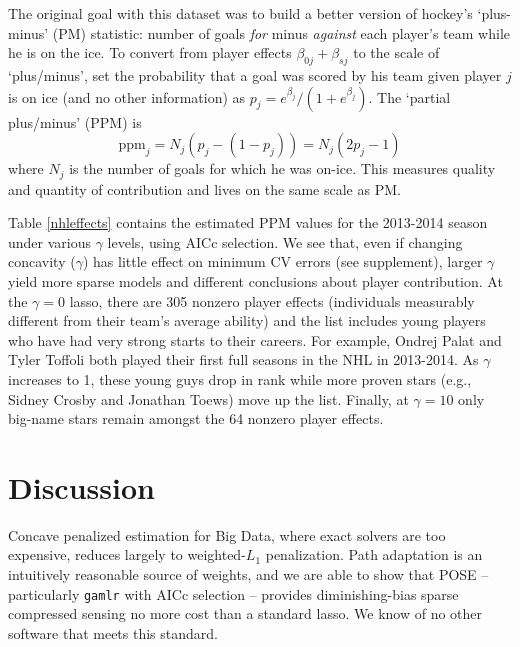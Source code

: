 \documentclass[twoside]{article}
\newcommand{\mr}[1]{\mathrm{#1}}
\begin{document}
The original goal with this dataset was to build a better version of
hockey's `plus-minus' (PM) statistic: number of goals {\it for} minus {\it
against} each player's team while he is on the ice. To convert from player
effects $\beta_{0j} + \beta_{sj}$ to the scale of `plus/minus', set the probability that a goal was scored by his team given player
$j$ is on ice  (and no other information) as $p_j = e^{\beta_j}/(1+e^{\beta_j})$. The `partial
plus/minus' (PPM) is \[ \mr{ppm}_j = N_j(p_j - (1-p_j)) = N_j(2p_j-1) \] where
$N_j$ is the  number of goals for which he was on-ice.  This measures 
quality and quantity of contribution and lives on the same scale as PM.

Table \ref{nhleffects} contains the estimated PPM values for the 2013-2014
season under various $\gamma$ levels, using AICc selection.  We see that, even
if changing concavity ($\gamma$) has little effect on minimum CV errors (see supplement),
larger $\gamma$  yield more sparse models and different conclusions about
player contribution. At the $\gamma=0$ lasso, there are 305 nonzero player
effects (individuals measurably different from their team's average ability)
and the list includes young players who have had very strong starts to their
careers.  For example, Ondrej Palat and Tyler Toffoli both played their first
full seasons in the NHL in 2013-2014.  As $\gamma$ increases to 1, these young
guys  drop in rank while more proven stars (e.g., Sidney Crosby and Jonathan
Toews) move up the list.  Finally, at $\gamma=10$ only big-name stars remain
amongst the 64 nonzero player effects.


\section{Discussion}
\label{discussion}


Concave penalized estimation for Big Data, where exact solvers are too
 expensive, reduces largely to weighted-$L_1$ penalization.
Path adaptation is an intuitively reasonable source of weights, and we are able to show that POSE -- particularly {\tt gamlr} with AICc selection -- provides diminishing-bias sparse compressed sensing
no more cost than a  standard lasso.  We know of no other software that meets this standard.





\end{document}

